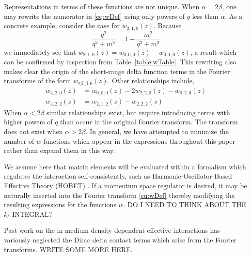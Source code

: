 \documentclass[%
 preprint,
 amsmath,amssymb,
 aps,
]{revtex4-1}
\newcommand{\w}[4]{w_{#1,#2,#3}(#4)}
\begin{document}
Representations in terms of these functions are not unique. When $\alpha=2\beta$, one may rewrite the numerator in \eqref{eq:wDef} using only powers of $q$ less than $\alpha$. As a concrete example, consider the case for $\w{2}{1}{0}{z}$. Because
\begin{equation}
\frac{q^2}{q^2+m^2}=1-\frac{m^2}{q^2+m^2}
\end{equation}
we immediately see that $\w{2}{1}{0}{z}=\w{0}{0}{0}{z}-\w{0}{1}{0}{z}$, a result which can be confirmed by inspection from Table~\ref{table:wTable}. This rewriting also makes clear the origin of the short-range delta function terms in the Fourier transforms of the form $\w{2\beta}{\beta}{0}{z}$. Other relationships include,
\begin{align}
\w{4}{2}{0}{z}&=\w{0}{0}{0}{z}-2 \w{2}{2}{0}{z}-\w{0}{2}{0}{z} \\
\w{4}{2}{2}{z}&=\w{2}{1}{2}{z}-\w{2}{2}{2}{z}
\end{align}
When $\alpha < 2\beta$ similar relationships exist, but require introducing terms with higher powers of $q$ than occur in the original Fourier transform. The transform does not exist when $\alpha>2\beta$. In general, we have attempted to minimize the number of $w$ functions which appear in the expressions throughout this paper rather than expand them in this way.

We assume here that matrix elements will be evaluated within a formalism which regulates the interaction self-consistently, such as Harmonic-Oscillator-Based Effective Theory (HOBET) \cite{PhysRevC.77.034005}. If a momentum space regulator is desired, it may be naturally inserted into the Fourier transform \eqref{eq:wDef} thereby modifying the resulting expressions for the functions $w$. DO I NEED TO THINK ABOUT THE $k_\delta$ INTEGRAL?

Past work on the in-medium density dependent effective interactions has variously neglected the Dirac delta contact terms which arise from the Fourier transforms. WRITE SOME MORE HERE.



\end{document}
